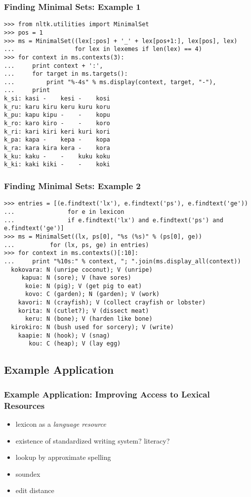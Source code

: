 \documentclass{beamer}             %
\begin{document}
\begin{frame}[fragile]
\frametitle{Finding Minimal Sets: Example 1}
\scriptsize

\begin{verbatim}
>>> from nltk.utilities import MinimalSet
>>> pos = 1
>>> ms = MinimalSet((lex[:pos] + '_' + lex[pos+1:], lex[pos], lex)
...                 for lex in lexemes if len(lex) == 4)
>>> for context in ms.contexts(3):
...     print context + ':',
...     for target in ms.targets():
...         print "%-4s" % ms.display(context, target, "-"),
...     print
k_si: kasi -    kesi -    kosi
k_ru: karu kiru keru kuru koru
k_pu: kapu kipu -    -    kopu
k_ro: karo kiro -    -    koro
k_ri: kari kiri keri kuri kori
k_pa: kapa -    kepa -    kopa
k_ra: kara kira kera -    kora
k_ku: kaku -    -    kuku koku
k_ki: kaki kiki -    -    koki
\end{verbatim}
\end{frame}

\begin{frame}[fragile]
\frametitle{Finding Minimal Sets: Example 2}
\scriptsize

\begin{verbatim}
>>> entries = [(e.findtext('lx'), e.findtext('ps'), e.findtext('ge'))
...               for e in lexicon
...               if e.findtext('lx') and e.findtext('ps') and e.findtext('ge')]
>>> ms = MinimalSet((lx, ps[0], "%s (%s)" % (ps[0], ge))
...          for (lx, ps, ge) in entries)
>>> for context in ms.contexts()[:10]:
...     print "%10s:" % context, "; ".join(ms.display_all(context))
  kokovara: N (unripe coconut); V (unripe)
     kapua: N (sore); V (have sores)
      koie: N (pig); V (get pig to eat)
      kovo: C (garden); N (garden); V (work)
    kavori: N (crayfish); V (collect crayfish or lobster)
    korita: N (cutlet?); V (dissect meat)
      keru: N (bone); V (harden like bone)
  kirokiro: N (bush used for sorcery); V (write)
    kaapie: N (hook); V (snag)
       kou: C (heap); V (lay egg)
\end{verbatim}
\end{frame}

\subsection{Example Application}

\begin{frame}
\frametitle{Example Application: Improving Access to Lexical Resources}
\begin{itemize}
\item lexicon as a \textit{language resource}
\item existence of standardized writing system?  literacy?
\item lookup by approximate spelling
\item soundex
\item edit distance
\end{itemize}
\end{frame}
\end{document}
